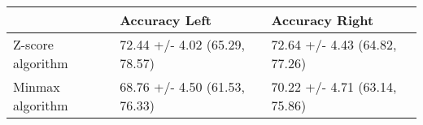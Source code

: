 \begin{tabular}{lll}
\toprule
{} &                  Accuracy Left &                 Accuracy Right \\
\midrule
Z-score algorithm &  72.44 +/- 4.02 (65.29, 78.57) &  72.64 +/- 4.43 (64.82, 77.26) \\
Minmax algorithm  &  68.76 +/- 4.50 (61.53, 76.33) &  70.22 +/- 4.71 (63.14, 75.86) \\
\bottomrule
\end{tabular}
